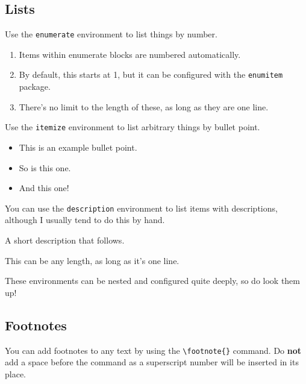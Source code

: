 \subsection{Lists}%
Use the \verb|enumerate| environment to list things by number.

\begin{enumerate}[noitemsep,topsep=0pt]
  \item Items within enumerate blocks are numbered automatically.
  \item By default, this starts at 1, but it can be configured with the \texttt{enumitem} package.
  \item There's no limit to the length of these, as long as they are one line.
\end{enumerate}

\vspace{5pt}

\noindent Use the \verb|itemize| environment to list arbitrary things by bullet point.

\begin{itemize}[noitemsep,topsep=0pt]
  \item This is an example bullet point.
  \item So is this one.
  \item And this one!
\end{itemize}

\vspace{5pt}

\noindent You can use the \verb|description| environment to list items with descriptions, although I usually tend to do this by hand.

\begin{description}[noitemsep,topsep=0pt]
  \item[The Title] A short description that follows.
  \item[Another Title] This can be any length, as long as it's one line.
\end{description}

\vspace{5pt}

\noindent These environments can be nested and configured quite deeply, so do look them up!

\subsection{Footnotes}%
You can add footnotes to any text by using the \verb|\footnote{}| command.
Do \textbf{not} add a space before the command as a superscript number will be inserted in its place.

